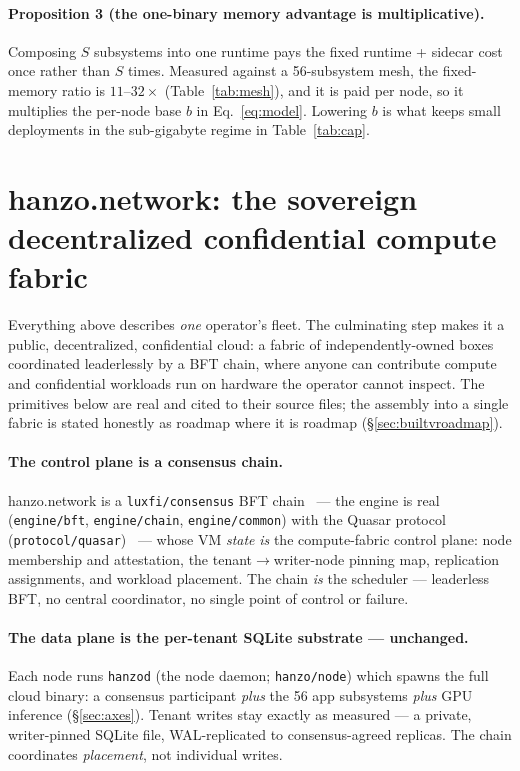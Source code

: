 \documentclass[11pt]{article}
\begin{document}
\paragraph{Proposition 3 (the one-binary memory advantage is multiplicative).}
Composing $S$ subsystems into one runtime pays the fixed runtime + sidecar cost once rather than
$S$ times. Measured against a 56-subsystem mesh, the fixed-memory ratio is $11$--$32\times$
(Table~\ref{tab:mesh}), and it is paid per node, so it multiplies the per-node base $b$ in
Eq.~\ref{eq:model}. Lowering $b$ is what keeps small deployments in the sub-gigabyte regime in
Table~\ref{tab:cap}.

\section{hanzo.network: the sovereign decentralized confidential compute fabric}
\label{sec:fabric}
\sloppy
Everything above describes \emph{one} operator's fleet. The culminating step makes it a public,
decentralized, confidential cloud: a fabric of independently-owned boxes coordinated leaderlessly
by a BFT chain, where anyone can contribute compute and confidential workloads run on hardware the
operator cannot inspect. The primitives below are real and cited to their source files; the
assembly into a single fabric is stated honestly as roadmap where it is roadmap
(\S\ref{sec:builtvroadmap}).

\paragraph{The control plane is a consensus chain.} hanzo.network is a \texttt{luxfi/consensus}
BFT chain~\cite{luxconsensus} --- the engine is real (\texttt{engine/bft}, \texttt{engine/chain},
\texttt{engine/common}) with the Quasar protocol (\texttt{protocol/quasar})~\cite{quasar} --- whose
VM \emph{state} \emph{is} the compute-fabric control plane: node membership and attestation, the
tenant$\to$writer-node pinning map, replication assignments, and workload placement. The chain
\emph{is} the scheduler --- leaderless BFT, no central coordinator, no single point of control or
failure.

\paragraph{The data plane is the per-tenant SQLite substrate --- unchanged.} Each node runs
\texttt{hanzod} (the node daemon; \texttt{hanzo/node}) which spawns the full cloud binary: a
consensus participant \emph{plus} the 56 app subsystems \emph{plus} GPU inference
(\S\ref{sec:axes}). Tenant writes stay exactly as measured --- a private, writer-pinned SQLite
file, WAL-replicated to consensus-agreed replicas. The chain coordinates \emph{placement}, not
individual writes.
\end{document}
